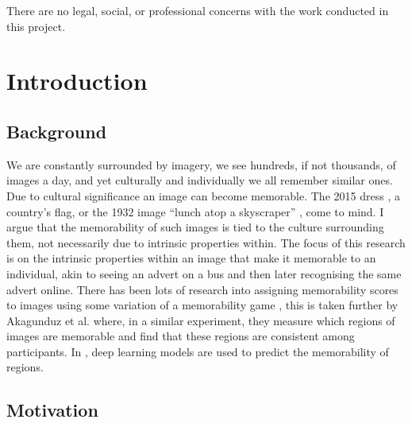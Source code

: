 \documentclass{UoYCSproject}
\begin{document}
There are no legal, social, or professional concerns with the work conducted in this project.

\chapter{Introduction}

\section{Background}

We are constantly surrounded by imagery, we see hundreds, if not thousands, of images a day, and yet culturally and individually we all remember similar ones. Due to cultural significance an image can become memorable. The 2015 dress \cite{BBCDress2015}, a country's flag, or the 1932 image “lunch atop a skyscraper” \cite{gambino_2012}, come to mind. I argue that the memorability of such images is tied to the culture surrounding them, not necessarily due to intrinsic properties within. The focus of this research is on the intrinsic properties within an image that make it memorable to an individual, akin to seeing an advert on a bus and then later recognising the same advert online.
There has been lots of research into assigning memorability scores to images using some variation of a memorability game \cite{Isola2011, IsolaParikhTorralbaOliva2011, ICCV15_Khosla, isola2014memorability}, this is taken further by Akagunduz et al. \cite{VischemaPaper} where, in a similar experiment, they measure which regions of images are memorable and find that these regions are consistent among participants. In \cite{VischemaPaper,ICCV15_Khosla}, deep learning models are used to predict the memorability of regions.

\section{Motivation}
\end{document}
